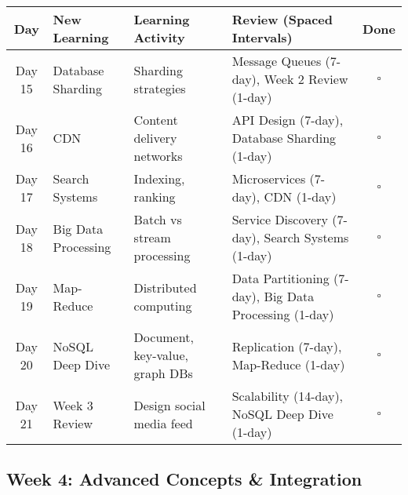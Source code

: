 \documentclass[10pt,a4paper]{article}
\begin{document}
\begin{table}[h]
\centering
\small
\begin{tabular}{|c|p{3cm}|p{4cm}|p{4cm}|c|}
\hline
\textbf{Day} & \textbf{New Learning} & \textbf{Learning Activity} & \textbf{Review (Spaced Intervals)} & \textbf{Done} \\
\hline
Day 15 & Database Sharding & Sharding strategies & Message Queues (7-day), Week 2 Review (1-day) & $\square$ \\
\hline
Day 16 & CDN & Content delivery networks & API Design (7-day), Database Sharding (1-day) & $\square$ \\
\hline
Day 17 & Search Systems & Indexing, ranking & Microservices (7-day), CDN (1-day) & $\square$ \\
\hline
Day 18 & Big Data Processing & Batch vs stream processing & Service Discovery (7-day), Search Systems (1-day) & $\square$ \\
\hline
Day 19 & Map-Reduce & Distributed computing & Data Partitioning (7-day), Big Data Processing (1-day) & $\square$ \\
\hline
Day 20 & NoSQL Deep Dive & Document, key-value, graph DBs & Replication (7-day), Map-Reduce (1-day) & $\square$ \\
\hline
Day 21 & Week 3 Review & Design social media feed & Scalability (14-day), NoSQL Deep Dive (1-day) & $\square$ \\
\hline
\end{tabular}
\end{table}

\subsection{Week 4: Advanced Concepts \& Integration}
\end{document}
